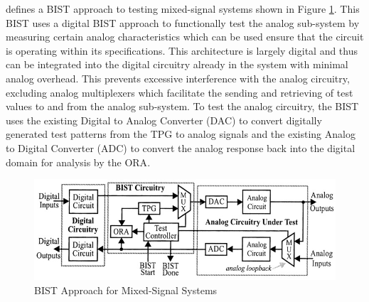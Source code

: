 \documentclass[12pt]{report}
\begin{document}
\cite{stroud} defines a BIST approach to testing mixed-signal systems shown in Figure \ref{fig:mixedbist1}.  This BIST uses a digital BIST approach to functionally test the analog sub-system by measuring certain analog characteristics which can be used ensure that the circuit is operating within its specifications.  This architecture is largely digital and thus can be integrated into the digital circuitry already in the system with minimal analog overhead.  This prevents excessive interference with the analog circuitry, excluding analog multiplexers which facilitate the sending and retrieving of test values to and from the analog sub-system\cite{stroud}.  To test the analog circuitry, the BIST uses the existing Digital to Analog Converter (DAC) to convert digitally generated test patterns from the TPG to analog signals and the existing Analog to Digital Converter (ADC) to convert the analog response back into the digital domain for analysis by the ORA\cite{stroud}.
\begin{figure}
	\begin{center}
		\includegraphics[scale=1]{images/mixed-bist-architecture}
	\end{center}
	\caption{BIST Approach for Mixed-Signal Systems\cite{stroud}}
	\label{fig:mixedbist1}
\end{figure}
\end{document}
